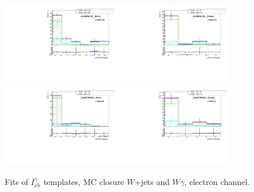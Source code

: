 \begin{figure}[htb]
\begin{center}
   \includegraphics[width=0.45\textwidth]{../figs/figs_v11/ELECTRON_WGamma/MCclosureWjetsPlusWg/c_TEMPL_CHISO_UNblind__phoEt95to120__Barrel__RooFit_MCclosure.pdf}\includegraphics[width=0.45\textwidth]{../figs/figs_v11/ELECTRON_WGamma/MCclosureWjetsPlusWg/c_TEMPL_CHISO_UNblind__phoEt95to120__Endcap__RooFit_MCclosure.pdf}\\
   \includegraphics[width=0.45\textwidth]{../figs/figs_v11/ELECTRON_WGamma/MCclosureWjetsPlusWg/c_TEMPL_CHISO_UNblind__phoEt120to500__Barrel__RooFit_MCclosure.pdf}\includegraphics[width=0.45\textwidth]{../figs/figs_v11/ELECTRON_WGamma/MCclosureWjetsPlusWg/c_TEMPL_CHISO_UNblind__phoEt120to500__Endcap__RooFit_MCclosure.pdf}\\
  \label{fig:templateFits_MCclosureWjetsPlusWg_CHISO_ELECTRON_3}
  \caption{Fits of $I_{ch}^{\gamma}$ templates, MC closure $W$+jets and $W\gamma$, electron channel.}
  \end{center}
\end{figure}

